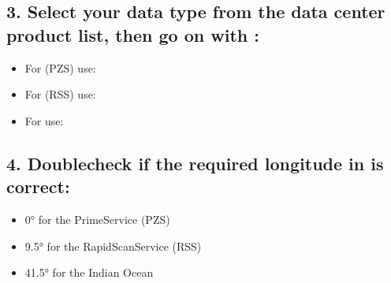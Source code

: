 \documentclass[letterpaper,10pt,english]{sphinxmanual}
\begin{document}
\subsection{3. Select your data type from the data center product list, then go on with :}
\label{\detokenize{ordering_data:select-your-data-type-from-the-data-center-product-list-then-go-on-with-next-step}}
\begin{itemize}
\item {} 
For  (PZS) use: 

\item {} 
For  (RSS) use: 

\item {} 
For  use: 

\end{itemize}


\subsection{4. Double\sphinxhyphen{}check if the required longitude in  is correct:}
\label{\detokenize{ordering_data:double-check-if-the-required-longitude-in-sub-sat-longitude-is-correct}}
\begin{itemize}
\item {} 
0° for the Prime\sphinxhyphen{}Service (PZS)

\item {} 
9.5° for the Rapid\sphinxhyphen{}Scan\sphinxhyphen{}Service (RSS)

\item {} 
41.5° for the Indian Ocean

\end{itemize}
\end{document}
